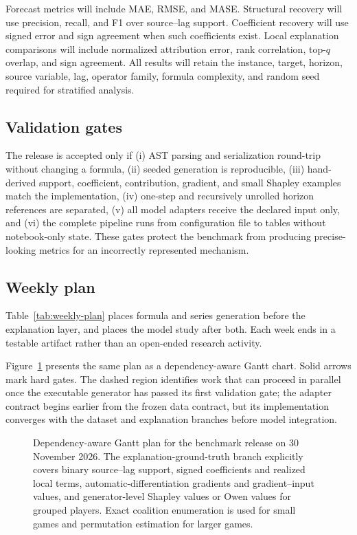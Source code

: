 Forecast metrics will include MAE, RMSE, and MASE. Structural recovery will use
precision, recall, and F1 over source--lag support. Coefficient recovery will
use signed error and sign agreement when such coefficients exist. Local
explanation comparisons will include normalized attribution error, rank
correlation, top-$q$ overlap, and sign agreement. All results will retain the
instance, target, horizon, source variable, lag, operator family, formula
complexity, and random seed required for stratified analysis.

\subsection{Validation gates}

The release is accepted only if (i) AST parsing and serialization round-trip
without changing a formula, (ii) seeded generation is reproducible, (iii)
hand-derived support, coefficient, contribution, gradient, and small Shapley
examples match the implementation, (iv) one-step and recursively unrolled
horizon references are separated, (v) all model adapters receive the declared
input only, and (vi) the complete pipeline runs from configuration file to
tables without notebook-only state. These gates protect the benchmark from
producing precise-looking metrics for an incorrectly represented mechanism.

\subsection{Weekly plan}

Table~\ref{tab:weekly-plan} places formula and series generation before the
explanation layer, and places the model study after both. Each week ends in a
testable artifact rather than an open-ended research activity.

Figure~\ref{fig:research-plan-gantt} presents the same plan as a dependency-aware
Gantt chart. Solid arrows mark hard gates. The dashed region identifies work
that can proceed in parallel once the executable generator has passed its first
validation gate; the adapter contract begins earlier from the frozen data
contract, but its implementation converges with the dataset and explanation
branches before model integration.

\begin{landscape}
\begin{figure}[H]
    \centering
    \resizebox{0.98\linewidth}{!}{%
    }
    \caption{Dependency-aware Gantt plan for the benchmark release on
    30 November 2026. The explanation-ground-truth branch explicitly covers
    binary source--lag support, signed coefficients and realized local terms,
    automatic-differentiation gradients and gradient--input values, and
    generator-level Shapley values or Owen values for grouped players. Exact
    coalition enumeration is used for small games and permutation estimation
    for larger games.}
    \label{fig:research-plan-gantt}
\end{figure}
\end{landscape}

